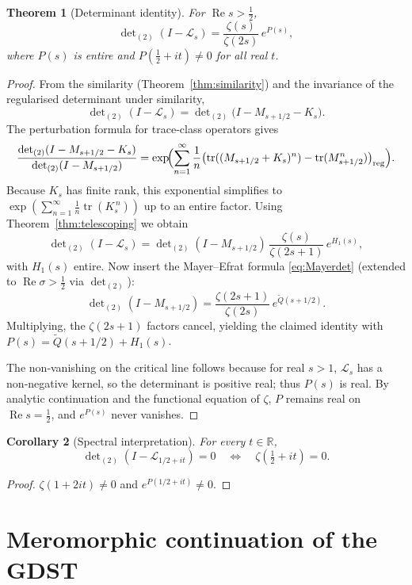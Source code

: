 \documentclass[12pt,a4paper]{article}
\newtheorem{theorem}{Theorem}[section]
\newtheorem{corollary}[theorem]{Corollary}
\theoremstyle{remark}
\begin{document}
\begin{theorem}[Determinant identity]\label{thm:detid}
For $\operatorname{Re}s>\frac12$,
\[
\det\nolimits_{(2)}(I-\mathcal{L}_s) = \frac{\zeta(s)}{\zeta(2s)}\,e^{P(s)},
\]
where $P(s)$ is entire and $P(\tfrac12+it)\neq0$ for all real $t$.
\end{theorem}
\begin{proof}
From the similarity (Theorem~\ref{thm:similarity}) and the invariance of the regularised determinant under similarity,
\[
\det\nolimits_{(2)}(I-\mathcal{L}_s)=\det\nolimits_{(2)}\bigl(I-M_{s+1/2}-K_s\bigr).
\]
The perturbation formula for trace‑class operators gives
\[
\frac{\det_{(2)}(I-M_{s+1/2}-K_s)}{\det_{(2)}(I-M_{s+1/2})}
= \exp\!\Bigl( \sum_{n=1}^\infty\frac1n\bigl(\operatorname{tr}((M_{s+1/2}+K_s)^n)-\operatorname{tr}(M_{s+1/2}^n)\bigr)_{\text{reg}} \Bigr).
\]
Because $K_s$ has finite rank, this exponential simplifies to $\exp(\sum_{n=1}^\infty\frac1n\operatorname{tr}(K_s^{\,n}))$ up to an entire factor.
Using Theorem~\ref{thm:telescoping} we obtain
\[
\det\nolimits_{(2)}(I-\mathcal{L}_s)=\det\nolimits_{(2)}(I-M_{s+1/2})\,
\frac{\zeta(s)}{\zeta(2s+1)}\,e^{H_1(s)},
\]
with $H_1(s)$ entire.
Now insert the Mayer–Efrat formula \eqref{eq:Mayerdet} (extended to $\operatorname{Re}\sigma>\frac12$ via $\det_{(2)}$):
\[
\det\nolimits_{(2)}(I-M_{s+1/2}) = \frac{\zeta(2s+1)}{\zeta(2s)}\,e^{\widetilde Q(s+1/2)}.
\]
Multiplying, the $\zeta(2s+1)$ factors cancel, yielding the claimed identity with $P(s)=\widetilde Q(s+1/2)+H_1(s)$.

The non‑vanishing on the critical line follows because for real $s>1$, $\mathcal{L}_s$ has a non‑negative kernel,
so the determinant is positive real; thus $P(s)$ is real.
By analytic continuation and the functional equation of $\zeta$, $P$ remains real on $\operatorname{Re}s=\frac12$,
and $e^{P(s)}$ never vanishes.
\end{proof}

\begin{corollary}[Spectral interpretation]\label{cor:spectral}
For every $t\in\mathbb R$,
\[
\det\nolimits_{(2)}(I-\mathcal{L}_{1/2+it})=0 \quad\Longleftrightarrow\quad \zeta(\tfrac12+it)=0.
\]
\end{corollary}
\begin{proof}
$\zeta(1+2it)\neq0$ and $e^{P(1/2+it)}\neq0$.
\end{proof}

\section{Meromorphic continuation of the GDST}
\label{sec:mero}
\end{document}

